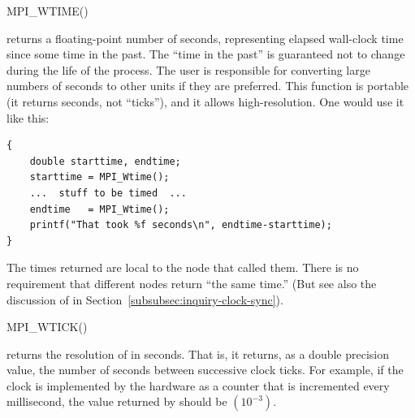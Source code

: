 \begin{funcdefna}{MPI\_WTIME}{()}
\end{funcdefna}

 returns a floating-point number of seconds,
representing elapsed wall-clock time since some time in
the past.
%
The ``time in the past'' is guaranteed not to change during the life of the
process.  The user is responsible for converting large numbers of seconds to
other units if they are preferred.
%
This function is portable (it returns seconds, not ``ticks''), and it allows
high-resolution.  One would use it like this:

\begin{example}
%
\begin{lstlisting}[language={[MPI]C}]
{
    double starttime, endtime;
    starttime = MPI_Wtime();
    ...  stuff to be timed  ...
    endtime   = MPI_Wtime();
    printf("That took %f seconds\n", endtime-starttime);
}
\end{lstlisting}
\end{example}

The times returned are local to the node that called them.
There is no requirement that different nodes return ``the same time.''
(But see also the discussion of
 in Section~\ref{subsubsec:inquiry-clock-sync}).

\begin{funcdefna}{MPI\_WTICK}{()}
\end{funcdefna}

 returns the resolution of
 in seconds.  That is, it
returns, as a double precision value, the number of seconds between successive
clock ticks.
For example, if the clock is implemented by the hardware as a counter that is
incremented every millisecond, the value returned by 
should be $(10^{-3})$.

